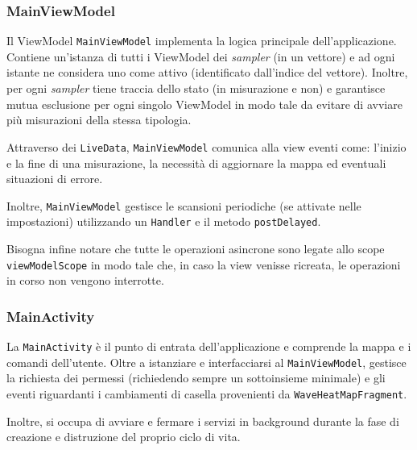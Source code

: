 \subsubsection{MainViewModel}
Il ViewModel \texttt{MainViewModel} implementa la logica principale dell'applicazione. Contiene un'istanza di tutti i ViewModel dei \textit{sampler} (in un vettore) e ad ogni istante ne considera uno come attivo (identificato dall'indice del vettore). Inoltre, per ogni \textit{sampler} tiene traccia dello stato (in misurazione e non) e garantisce mutua esclusione per ogni singolo ViewModel in modo tale da evitare di avviare più misurazioni della stessa tipologia.

Attraverso dei \texttt{LiveData}, \texttt{MainViewModel} comunica alla view eventi come: l'inizio e la fine di una misurazione, la necessità di aggiornare la mappa ed eventuali situazioni di errore.

Inoltre, \texttt{MainViewModel} gestisce le scansioni periodiche (se attivate nelle impostazioni) utilizzando un \texttt{Handler} e il metodo \texttt{postDelayed}.

Bisogna infine notare che tutte le operazioni asincrone sono legate allo scope \texttt{viewModelScope} in modo tale che, in caso la view venisse ricreata, le operazioni in corso non vengono interrotte.


\subsubsection{MainActivity}
La \texttt{MainActivity} è il punto di entrata dell'applicazione e comprende la mappa e i comandi dell'utente.
Oltre a istanziare e interfacciarsi al \texttt{MainViewModel}, gestisce la richiesta dei permessi (richiedendo sempre un sottoinsieme minimale) e gli eventi riguardanti i cambiamenti di casella provenienti da \texttt{WaveHeatMapFragment}.

Inoltre, si occupa di avviare e fermare i servizi in background durante la fase di creazione e distruzione del proprio ciclo di vita.